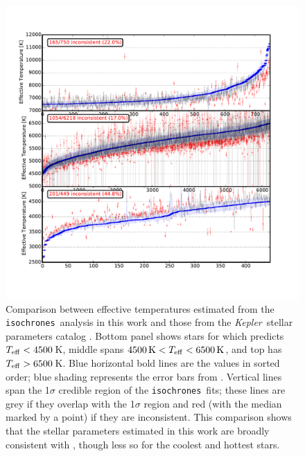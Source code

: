 \documentclass{emulateapj}
\newcommand{\kepler}{\textit{Kepler}}
\newcommand{\isochrones}{\texttt{isochrones}}
\begin{document}
\begin{figure}[p]
\begin{center}
\includegraphics[width=7in]{figures/hubercompare_teff.pdf}
\end{center}
\caption{Comparison between effective temperatures estimated from the
  \isochrones\ analysis in this work and those from the
  \kepler\ stellar parameters catalog \citep[][hereafter
    ]{Huber:2014}.  Bottom panel shows stars
  for which  predicts $T_{\rm eff} < 4500$\,K,
  middle spans $4500\,{\rm K} < T_{\rm eff} < 6500\,{\rm K}$, and top
  has $T_{\rm eff} > 6500$\,K. Blue horizontal bold lines are the
   values in sorted order; blue shading
  represents the error bars from .  Vertical
  lines span the 1$\sigma$ credible region of the \isochrones\ fits;
  these lines are grey if they overlap with the
   1$\sigma$ region and red (with the median
  marked by a point) if they are inconsistent.  This comparison shows
  that the stellar parameters estimated in this work are broadly
  consistent with , though less so for the
  coolest and hottest stars.
\label{fig:starsteff}}
\end{figure}
\end{document}

